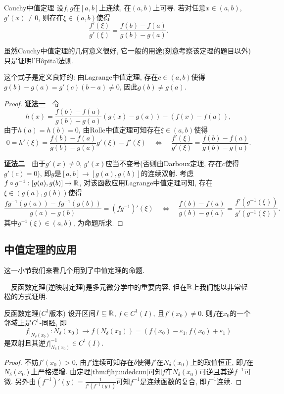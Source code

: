 \begin{theorem}{Cauchy中值定理}
	设$f,g$在$[a,b]$上连续, 在$(a,b)$上可导. 若对任意$x \in (a,b)$, $g'(x) \neq 0$, 则存在$\xi \in (a,b)$使得$$\frac{f'(\xi)}{g'(\xi)} = \frac{f(b)-f(a)}{g(b)-g(a)}. $$
\end{theorem}
\begin{remark}
	虽然Cauchy中值定理的几何意义很好, 它一般的用途(刻意考察该定理的题目以外)只是证明l’Hôpital法则. 
\end{remark}
\begin{remark}
	这个式子是定义良好的: 由Lagrange中值定理, 存在$c \in (a,b)$使得$g(b)-g(a) = g'(c)(b-a) \neq 0$, 因此$g(b) \neq g(a)$. 
\end{remark}
\begin{proof}
	\underline{\textbf{证法一}}~~令$$h(x)=\frac{f(b)-f(a)}{g(b)-g(a)}(g(x)-g(a))-(f(x)-f(a)), $$
	由于$h(a)=h(b)=0$, 由Rolle中值定理可知存在$\xi \in (a,b)$使得$$0=h'(\xi)=\frac{f(b)-f(a)}{g(b)-g(a)} g'(\xi) - f'(\xi) \quad \Leftrightarrow \quad \frac{f'(\xi)}{g'(\xi)} = \frac{f(b)-f(a)}{g(b)-g(a)}. $$
	
	\underline{\textbf{证法二}}~~由于$g'(x) \neq 0$, $g'(x)$应当不变号(否则由Darboux定理, 存在$c$使得$g'(c)=0$), 即$g$是$[a,b] \to [g(a),g(b)]$的连续双射. 考虑$f \circ g^{-1}:[g(a),g(b)] \to \mathbb{R}$, 对该函数应用Lagrange中值定理可知, 存在$\xi \in (g(a),g(b))$使得$$\frac{fg^{-1}(g(a))-fg^{-1}(g(b))}{g(a)-g(b)} = (fg^{-1})'(\xi) \quad \Leftrightarrow \quad \frac{f(b)-f(a)}{g(b)-g(a)} = \frac{f'(g^{-1}(\xi))}{g'(g^{-1}(\xi))}.$$
	其中$g^{-1}(\xi) \in (a,b)$, 为命题所求. 
\end{proof}

\subsection{中值定理的应用}

这一小节我们来看几个用到了中值定理的命题. 

~~反函数定理(逆映射定理)是多元微分学中的重要内容, 但在$\mathbb{R}$上我们能以非常轻松的方式证明. 

\begin{theorem}{反函数定理($C^1$版本)}
	设开区间$I \subseteq \mathbb{R}$, $f \in C^1(I)$, 且$f'(x_0) \neq 0$. 则$f$在$x_0$的一个邻域上是$C^1$-同胚, 即$$f|_{N_{\delta}(x_0)}:N_{\delta}(x_0) \to f(N_{\delta}(x_0)) = (f(x_0)-\varepsilon _1,f(x_0)+\varepsilon _1)$$
	是双射且其逆$f|_{N_{\delta}(x_0)}^{-1} \in C^1(I)$. 
\end{theorem}
\begin{proof}
	不妨$f'(x_0)>0$, 由$f'$连续可知存在$\delta$使得$f'$在$N_{\delta}(x_0)$上的取值恒正, 即$f$在$N_{\delta}(x_0)$上严格递增. 由定理\ref{thm:fjhjuudedcuu}可知$f$在$N_{\delta}(x_0)$可逆且其逆$f^{-1}$可微. 另外由$(f^{-1})'(y)=\frac{1}{f'(f^{-1}(y))}$可知$f^{-1}$是连续函数的复合, 即$f^{-1}$连续. 
\end{proof}

